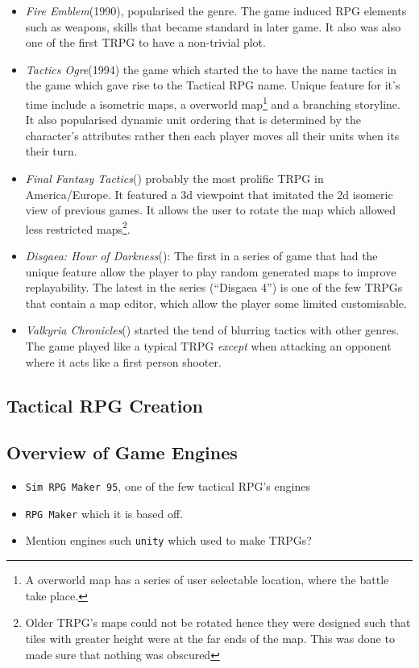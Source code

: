 \begin{itemize}
	
	\item \emph{Fire Emblem}(1990), popularised the genre. The game induced RPG elements such as weapons, skills that became standard in later game. It also was also one of the first TRPG to have a non-trivial plot. 

	\item \emph{Tactics Ogre}(1994) the game which started the to have the name tactics in the game  which gave rise to the Tactical RPG name\footnotemark[\value{footnote}]\cite{tactics}. Unique feature for it's time include a isometric maps, a overworld map\footnote{A overworld map has a series of user selectable location, where the battle take place.} and  a branching storyline. It also popularised dynamic unit ordering that is determined by the character's attributes rather then each player moves all their units when its their turn.

	\item \emph{Final Fantasy Tactics}() probably the most prolific TRPG in America/Europe. It featured a 3d viewpoint that imitated  the 2d isomeric view of previous games.  It allows the user to rotate the map which allowed less restricted maps\footnote{Older TRPG's maps could not be rotated hence they were designed such that tiles with greater height were at the far ends of the map. This was done to made sure that nothing was obscured}.
	
	\item  \emph{Disgaea: Hour of Darkness}(): The first in a series of game that had the unique feature allow the player to play random generated maps to improve replayability. The latest in the series (``Disgaea 4'') is one of the few TRPGs that contain a map editor, which allow the player some limited customisable. 


	\item  \emph{Valkyria Chronicles}() started the tend of blurring tactics with other genres. The game played like a typical TRPG \emph{except} when attacking an opponent where it acts like a first person shooter.

\end{itemize}


\subsection{Tactical RPG Creation}

\subsection{Overview of Game Engines}
\label{sub:overview_of_game_engines}

\begin{itemize}
	\item \texttt{Sim RPG Maker 95}, one of the few tactical RPG's engines
	\item \texttt{RPG Maker} which it is based off. 
	\item Mention  engines such \texttt{unity} which used to make TRPGs?  
\end{itemize}

